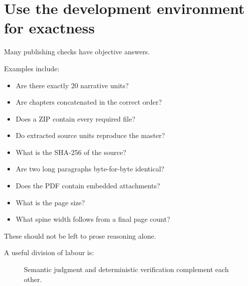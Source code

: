 \documentclass[11pt,oneside,openany]{book}
\providecommand{\tightlist}{%
  \setlength{\itemsep}{0pt}\setlength{\parskip}{0pt}}
\begin{document}
\chapter{Use the development environment for exactness}

Many publishing checks have objective answers.

Examples include:

\begin{itemize}
\tightlist
\item
  Are there exactly 20 narrative units?
\item
  Are chapters concatenated in the correct order?
\item
  Does a ZIP contain every required file?
\item
  Do extracted source units reproduce the master?
\item
  What is the SHA-256 of the source?
\item
  Are two long paragraphs byte-for-byte identical?
\item
  Does the PDF contain embedded attachments?
\item
  What is the page size?
\item
  What spine width follows from a final page count?
\end{itemize}

These should not be left to prose reasoning alone.

A useful division of labour is:

\begin{figure}[htbp]
\centering
{}
\caption{Semantic judgment and deterministic verification complement each other.}
\end{figure}
\end{document}
